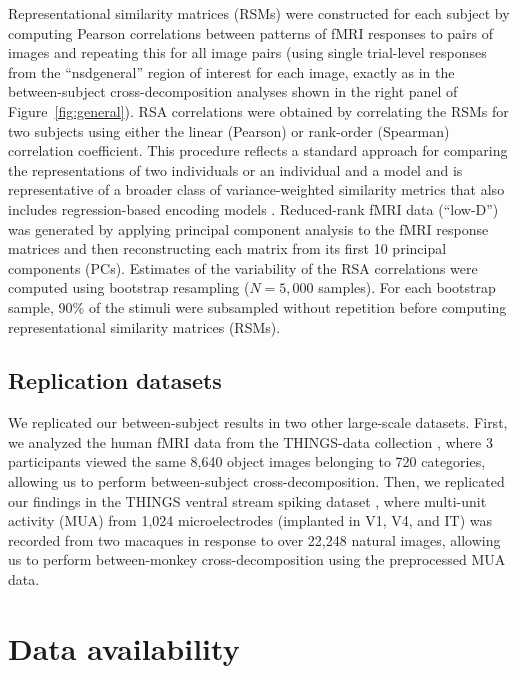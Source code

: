 \documentclass[10pt]{article}
\begin{document}
Representational similarity matrices (RSMs) were constructed for each subject by computing Pearson correlations between patterns of fMRI responses to pairs of images and repeating this for all image pairs (using single trial-level responses from the ``nsdgeneral'' region of interest for each image, exactly as in the between-subject cross-decomposition analyses shown in the right panel of Figure~\ref{fig:general}). RSA correlations were obtained by correlating the RSMs for two subjects using either the linear (Pearson) or rank-order (Spearman) correlation coefficient. This procedure reflects a standard approach for comparing the representations of two individuals or an individual and a model and is representative of a broader class of variance-weighted similarity metrics that also includes regression-based encoding models \autocite{Kriegeskorte2019,Kornblith2019}. Reduced-rank fMRI data (``low-D'') was generated by applying principal component analysis to the fMRI response matrices and then reconstructing each matrix from its first 10 principal components (PCs). Estimates of the variability of the RSA correlations were computed using bootstrap resampling (\(N = 5,000\) samples). For each bootstrap sample, 90\% of the stimuli were subsampled without repetition before computing representational similarity matrices (RSMs).

\subsection{Replication datasets}\label{replication-datasets}

We replicated our between-subject results in two other large-scale datasets. First, we analyzed the human fMRI data from the THINGS-data collection \autocite{Hebart2023}, where 3 participants viewed the same 8,640 object images belonging to 720 categories, allowing us to perform between-subject cross-decomposition. Then, we replicated our findings in the THINGS ventral stream spiking dataset \autocite{Papale2025}, where multi-unit activity (MUA) from 1,024 microelectrodes (implanted in V1, V4, and IT) was recorded from two macaques in response to over 22,248 natural images, allowing us to perform between-monkey cross-decomposition using the preprocessed MUA data.

\section{Data availability}\label{data-availability}
\end{document}
